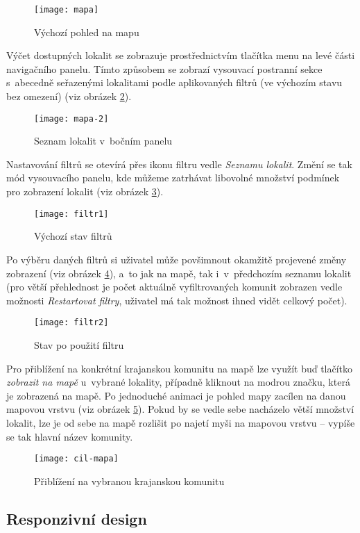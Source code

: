 \begin{figure}[hb!]   
    \centering
    \texttt{[image: mapa]}  
    \caption{Výchozí pohled na mapu}
    \label{mapa}
\end{figure}

Výčet dostupných lokalit se zobrazuje prostřednictvím tlačítka menu na levé části navigačního panelu. Tímto způsobem se zobrazí vysouvací postranní sekce s~abecedně seřazenými lokalitami podle aplikovaných filtrů (ve výchozím stavu bez omezení) (viz obrázek \ref{mapa-2}).

\begin{figure}[hb!]   
    \centering
    \texttt{[image: mapa-2]}  
    \caption{Seznam lokalit v~bočním panelu}
    \label{mapa-2}
\end{figure}

Nastavování filtrů se otevírá přes ikonu filtru vedle \emph{Seznamu lokalit}. Změní se tak mód vysouvacího panelu, kde můžeme zatrhávat libovolné množství podmínek pro zobrazení lokalit (viz obrázek \ref{filtr1}).

\begin{figure}[hb!]   
    \centering
    \texttt{[image: filtr1]} 
    \caption{Výchozí stav filtrů}
    \label{filtr1}
\end{figure}

Po výběru daných filtrů si uživatel může povšimnout okamžitě projevené změny zobrazení (viz obrázek \ref{filtr2}), a~to jak na mapě, tak i~v~předchozím seznamu lokalit (pro větší přehlednost je počet aktuálně vyfiltrovaných komunit zobrazen vedle možnosti \emph{Restartovat filtry}, uživatel má tak možnost ihned vidět celkový počet).

\begin{figure}[hb!]   
    \centering
    \texttt{[image: filtr2]}  
    \caption{Stav po použití filtru}
    \label{filtr2}
\end{figure}

Pro přiblížení na konkrétní krajanskou komunitu na mapě lze využít buď tlačítko \emph{zobrazit na mapě} u~vybrané lokality, případně kliknout na modrou značku, která je zobrazená na mapě. Po jednoduché animaci je pohled mapy zacílen na danou mapovou vrstvu (viz obrázek \ref{cil-mapa}). Pokud by se vedle sebe nacházelo větší množství lokalit, lze je od sebe na mapě rozlišit po najetí myši na mapovou vrstvu -- vypíše se tak hlavní název komunity.

\begin{figure}[hb!]   
    \centering
    \texttt{[image: cil-mapa]}  
    \caption{Přiblížení na vybranou krajanskou komunitu}
    \label{cil-mapa}
\end{figure}

\hypertarget{responzivnuxed-design}{%
\subsection{Responzivní design}\label{responzivnuxed-design}}
